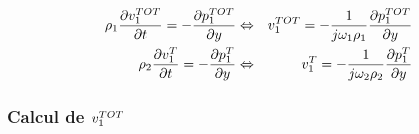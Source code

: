 \begin{eqnarray}
    \rho_1\frac{\partial v^{TOT}_1}{\partial t} = -\frac{\partial p^{TOT}_1}{\partial y}
        & \Leftrightarrow & v^{TOT}_1 = -\frac{1}{j\omega_1\rho_1}\frac{\partial p^{TOT}_1}{\partial y}\label{i1_euler1}\\
    \rho_2\frac{\partial v^T_1}{\partial t} = -\frac{\partial p^T_1}{\partial y}
        & \Leftrightarrow & v^T_1 = -\frac{1}{j\omega_2\rho_2}\frac{\partial p^T_1}{\partial y}\label{i1_euler2}
\end{eqnarray}

\subsubsection{Calcul de $v^{TOT}_1$}


